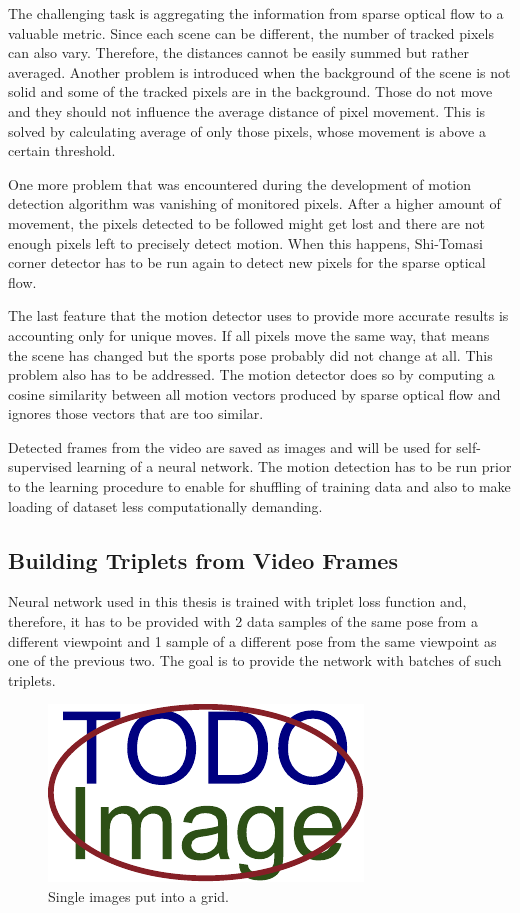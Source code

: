 The challenging task is aggregating the information from sparse optical flow to a valuable metric. Since each scene can be different, the number of tracked pixels can also vary. Therefore, the distances cannot be easily summed but rather averaged. Another problem is introduced when the background of the scene is not solid and some of the tracked pixels are in the background. Those do not move and they should not influence the average distance of pixel movement. This is solved by calculating average of only those pixels, whose movement is above a certain threshold.

One more problem that was encountered during the development of motion detection algorithm was vanishing of monitored pixels. After a higher amount of movement, the pixels detected to be followed might get lost and there are not enough pixels left to precisely detect motion. When this happens, Shi-Tomasi corner detector has to be run again to detect new pixels for the sparse optical flow.

The last feature that the motion detector uses to provide more accurate results is accounting only for unique moves. If all pixels move the same way, that means the scene has changed but the sports pose probably did not change at all. This problem also has to be addressed. The motion detector does so by computing a cosine similarity between all motion vectors produced by sparse optical flow and ignores those vectors that are too similar.

Detected frames from the video are saved as images and will be used for self-supervised learning of a neural network. The motion detection has to be run prior to the learning procedure to enable for shuffling of training data and also to make loading of dataset less computationally demanding.

\subsection{Building Triplets from Video Frames}

Neural network used in this thesis is trained with triplet loss function and, therefore, it has to be provided with 2 data samples of the same pose from a different viewpoint and 1 sample of a different pose from the same viewpoint as one of the previous two. The goal is to provide the network with batches of such triplets.

\begin{figure}[ht]
    \centering
    \includegraphics{figures/placeholder.pdf}
    \caption{Single images put into a grid.}
    \label{fig:grid-of-images}
\end{figure}

